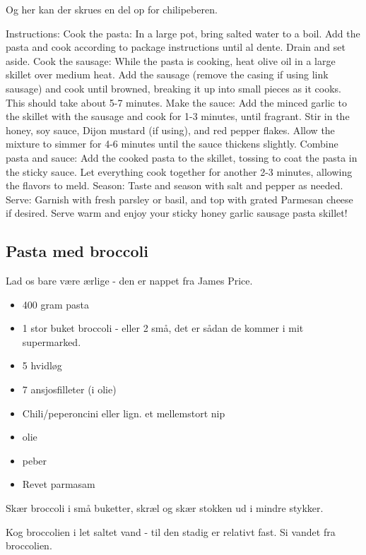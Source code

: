 \documentclass[
]{book}
\providecommand{\tightlist}{%
  \setlength{\itemsep}{0pt}\setlength{\parskip}{0pt}}
\begin{document}
Og her kan der skrues en del op for chilipeberen.

Instructions:
Cook the pasta: In a large pot, bring salted water to a boil. Add the pasta and cook according to package instructions until al dente. Drain and set aside.
Cook the sausage: While the pasta is cooking, heat olive oil in a large skillet over medium heat. Add the sausage (remove the casing if using link sausage) and cook until browned, breaking it up into small pieces as it cooks. This should take about 5-7 minutes.
Make the sauce: Add the minced garlic to the skillet with the sausage and cook for 1-3 minutes, until fragrant. Stir in the honey, soy sauce, Dijon mustard (if using), and red pepper flakes. Allow the mixture to simmer for 4-6 minutes until the sauce thickens slightly.
Combine pasta and sauce: Add the cooked pasta to the skillet, tossing to coat the pasta in the sticky sauce. Let everything cook together for another 2-3 minutes, allowing the flavors to meld.
Season: Taste and season with salt and pepper as needed.
Serve: Garnish with fresh parsley or basil, and top with grated Parmesan cheese if desired. Serve warm and enjoy your sticky honey garlic sausage pasta skillet!

\hypertarget{pasta-med-broccoli-1}{%
\subsection{Pasta med broccoli}\label{pasta-med-broccoli-1}}

Lad os bare være ærlige - den er nappet fra James Price.

\begin{itemize}
\tightlist
\item
  400 gram pasta
\item
  1 stor buket broccoli - eller 2 små, det er sådan de kommer i mit supermarked.
\item
  5 hvidløg
\item
  7 ansjosfilleter (i olie)
\item
  Chili/peperoncini eller lign. et mellemstort nip
\item
  olie
\item
  peber
\item
  Revet parmasam
\end{itemize}

Skær broccoli i små buketter, skræl og skær stokken ud i mindre stykker.

Kog broccolien i let saltet vand - til den stadig er relativt fast. Si vandet fra broccolien.
\end{document}
